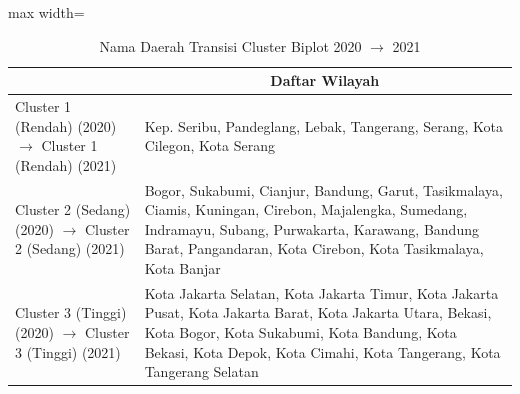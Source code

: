 \begin{table}[H]
\centering
\caption{Nama Daerah Transisi Cluster Biplot 2020 \(\rightarrow\) 2021} \label{tab:app1biplot_trans_name_2020x2021}
\begin{adjustbox}{max width=\textwidth}
\begin{tabular}{|>{\centering\arraybackslash}p{4cm}|p{10cm}|}
\hline
\multicolumn{1}{|c|}{\textbf{Kategori}} & \multicolumn{1}{c|}{\textbf{Daftar Wilayah}} \\
\hline
Cluster 1 (Rendah) (2020) \(\rightarrow\) Cluster 1 (Rendah) (2021) & Kep. Seribu, Pandeglang, Lebak, Tangerang, Serang, Kota Cilegon, Kota Serang \\
\hline
Cluster 2 (Sedang) (2020) \(\rightarrow\) Cluster 2 (Sedang) (2021) & Bogor, Sukabumi, Cianjur, Bandung, Garut, Tasikmalaya, Ciamis, Kuningan, Cirebon, Majalengka, Sumedang, Indramayu, Subang, Purwakarta, Karawang, Bandung Barat, Pangandaran, Kota Cirebon, Kota Tasikmalaya, Kota Banjar \\
\hline
Cluster 3 (Tinggi) (2020) \(\rightarrow\) Cluster 3 (Tinggi) (2021) & Kota Jakarta Selatan, Kota Jakarta Timur, Kota Jakarta Pusat, Kota Jakarta Barat, Kota Jakarta Utara, Bekasi, Kota Bogor, Kota Sukabumi, Kota Bandung, Kota Bekasi, Kota Depok, Kota Cimahi, Kota Tangerang, Kota Tangerang Selatan \\
\hline
\end{tabular}
\end{adjustbox}
\end{table}